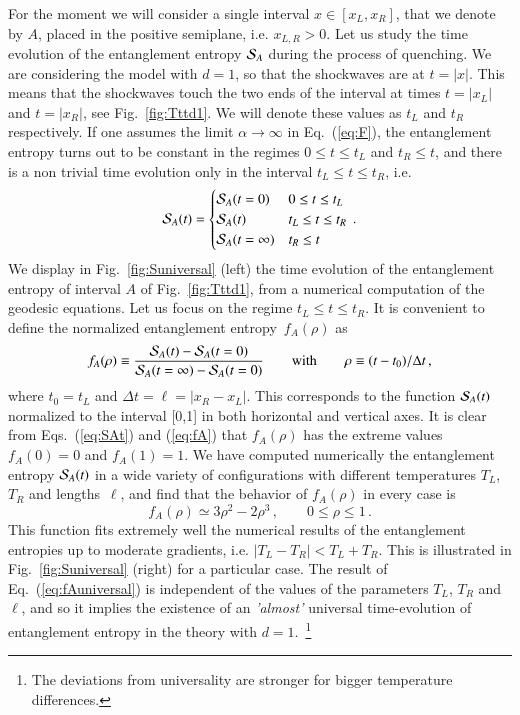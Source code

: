 \documentclass[epj]{webofc}
\begin{document}
For the moment we will consider a single interval $x \in [x_L,x_R]$, that we denote by $A$, placed in the positive semiplane, i.e. $x_{L,R}>0$. Let us study the time evolution of the entanglement entropy ${\cal S}_A$ during the process of quenching. We are considering the model with $d=1$, so that the shockwaves are at $t = |x|$. This means that the shockwaves touch the two ends of the interval at times $t=|x_L|$ and $t=|x_R|$, see Fig.~\ref{fig:Tttd1}. We will denote these values as $t_L$ and $t_R$ respectively. If one assumes the limit $\alpha \to \infty$ in Eq.~(\ref{eq:F}), the entanglement entropy turns out to be constant in the regimes $0 \le t \le t_L$ and $t_R \le t$, and there is a non trivial time evolution only in the interval $t_L \le t \le t_R$, i.e.
\begin{equation}
{\cal S}_A(t) =
\begin{cases}
{\cal S}_A(t=0)       &   0 \le t \le t_L \\
{\cal S}_A(t)         &   t_L  \le   t  \le t_R  \\
{\cal S}_A(t=\infty)  &   t_R \le t  
\end{cases}  \,.  \label{eq:SAt}
\end{equation} 
We display in Fig.~\ref{fig:Suniversal} (left) the time evolution of the entanglement entropy of interval $A$ of Fig.~\ref{fig:Tttd1}, from a numerical computation of the geodesic equations. Let us focus on the regime $t_L  \le   t  \le t_R $. It is convenient to define the normalized entanglement entropy~$f_A(\rho)$ as
\begin{equation}
f_A(\rho ) \equiv \frac{{\cal S}_A(t) - {\cal S}_A(t=0)}{{\cal S}_A(t=\infty) - {\cal S}_A(t=0)} \qquad \textrm{with} \qquad \rho \equiv (t-t_0)/\Delta t  \,, \label{eq:fA} 
\end{equation}
where $t_0 = t_L$ and $\Delta t = \ell = |x_R - x_L|$. This corresponds to the function ${\cal S}_A(t)$ normalized to the interval [0,1] in both horizontal and vertical axes. It is clear from Eqs.~(\ref{eq:SAt}) and (\ref{eq:fA}) that $f_A(\rho)$ has the extreme values $f_A(0)=0$ and $f_A(1)=1$. We have computed numerically the entanglement entropy ${\cal S}_A(t)$ in a wide variety of configurations with different temperatures $T_L$, $T_R$ and lengths~$\ell$, and find that the behavior of $f_A(\rho)$ in every case is
\begin{equation}
f_A(\rho ) \simeq 3\rho^2-2\rho^3  \,, \qquad 0 \le \rho \le 1 \,. \label{eq:fAuniversal}
\end{equation}
This function fits extremely well the numerical results of the entanglement entropies up to moderate gradients, i.e. $|T_L - T_R| < T_L + T_R$. This is illustrated in Fig.~\ref{fig:Suniversal} (right) for a particular case. The result of Eq.~(\ref{eq:fAuniversal}) is independent of the values of the parameters $T_L$, $T_R$ and $\ell$, and so it implies the existence of an {\it 'almost'} universal time-evolution of entanglement entropy in the theory with $d=1$.~\footnote{The deviations from universality are stronger for bigger temperature differences.} 
\end{document}
